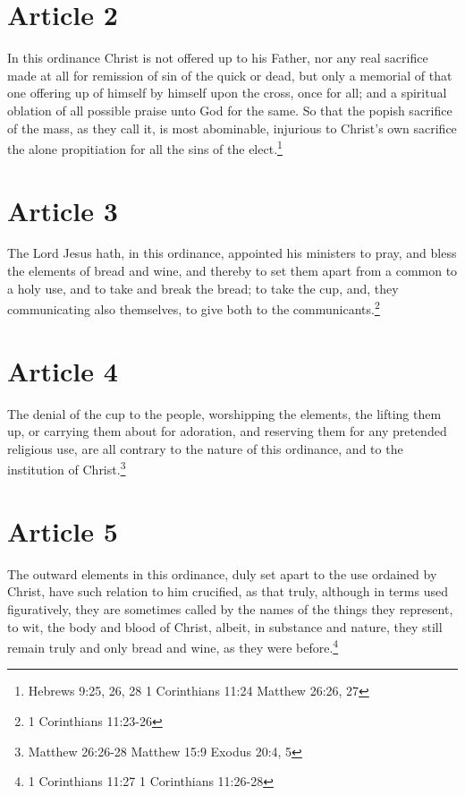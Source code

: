 \documentclass[12pt,letterpaper]{book}
\begin{document}
\section{Article 2}

In this ordinance Christ is not offered up to his Father, nor any real sacrifice made at all for remission of sin of the quick or dead, but only a memorial of that one offering up of himself by himself upon the cross, once for all; and a spiritual oblation of all possible praise unto God for the same. So that the popish sacrifice of the mass, as they call it, is most abominable, injurious to Christ's own sacrifice the alone propitiation for all the sins of the elect.\footnote{Hebrews 9:25, 26, 28 1 Corinthians 11:24 Matthew 26:26, 27}

\section{Article 3}

The Lord Jesus hath, in this ordinance, appointed his ministers to pray, and bless the elements of bread and wine, and thereby to set them apart from a common to a holy use, and to take and break the bread; to take the cup, and, they communicating also themselves, to give both to the communicants.\footnote{1 Corinthians 11:23-26}

\section{Article 4}

The denial of the cup to the people, worshipping the elements, the lifting them up, or carrying them about for adoration, and reserving them for any pretended religious use, are all contrary to the nature of this ordinance, and to the institution of Christ.\footnote{Matthew 26:26-28 Matthew 15:9 Exodus 20:4, 5}

\section{Article 5}

The outward elements in this ordinance, duly set apart to the use ordained by Christ, have such relation to him crucified, as that truly, although in terms used figuratively, they are sometimes called by the names of the things they represent, to wit, the body and blood of Christ, albeit, in substance and nature, they still remain truly and only bread and wine, as they were before.\footnote{1 Corinthians 11:27 1 Corinthians 11:26-28}
\end{document}
